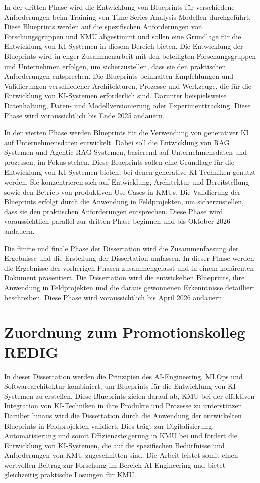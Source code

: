 \documentclass[11pt,a4paper,pointlessnumbers]{scrartcl}
\theoremstyle{break}
\numberwithin{equation}{section}
\begin{document}
In der dritten Phase wird die Entwicklung von Blueprints für verschiedene Anforderungen beim Training von Time Series Analysis Modellen durchgeführt. Diese Blueprints werden auf die spezifischen Anforderungen von Forschungsgruppen und KMU abgestimmt und sollen eine Grundlage für die Entwicklung von KI-Systemen in diesem Bereich bieten. Die Entwicklung der Blueprints wird in enger Zusammenarbeit mit den beteiligten Forschungsgruppen und Unternehmen erfolgen, um sicherzustellen, dass sie den praktischen Anforderungen entsprechen. Die Blueprints beinhalten Empfehlungen und Validierungen verschiedener Architekturen, Prozesse und Werkzeuge, die für die Entwicklung von KI-Systemen erforderlich sind. Darunter beispielsweise Datenhaltung, Daten- und Modellversionierung oder Experimenttracking. Diese Phase wird voraussichtlich bis Ende 2025 andauern.

In der vierten Phase werden Blueprints für die Verwendung von generativer KI auf Unternehmensdaten entwickelt. Dabei soll die Entwicklung von RAG Systemen und Agentic RAG Systemen, basierend auf Unternehmensdaten und -prozessen, im Fokus stehen. Diese Blueprints sollen eine Grundlage für die Entwicklung von KI-Systemen bieten, bei denen generative KI-Techniken genutzt werden. Sie konzentrieren sich auf Entwicklung, Architektur und Bereitstellung sowie den Betrieb von produktiven Use-Cases in KMUs. Die Validierung der Blueprints erfolgt durch die Anwendung in Feldprojekten, um sicherzustellen, dass sie den praktischen Anforderungen entsprechen. Diese Phase wird voraussichtlich parallel zur dritten Phase beginnen und bis Oktober 2026 andauern.

Die fünfte und finale Phase der Dissertation wird die Zusammenfassung der Ergebnisse und die Erstellung der Dissertation umfassen. In dieser Phase werden die Ergebnisse der vorherigen Phasen zusammengefasst und in einem kohärenten Dokument präsentiert. Die Dissertation wird die entwickelten Blueprints, ihre Anwendung in Feldprojekten und die daraus gewonnenen Erkenntnisse detailliert beschreiben. Diese Phase wird voraussichtlich bis April 2026 andauern.


\section{Zuordnung zum Promotionskolleg REDIG}
In dieser Dissertation werden die Prinzipien des AI-Engineering, MLOps und Softwarearchitektur kombiniert, um Blueprints für die Entwicklung von KI-Systemen zu erstellen. Diese Blueprints zielen darauf ab, KMU bei der effektiven Integration von KI-Techniken in ihre Produkte und Prozesse zu unterstützen. Darüber hinaus wird die Dissertation durch die Anwendung der entwickelten Blueprints in Feldprojekten validiert. Dies trägt zur Digitalisierung, Automatisierung und somit Effizienzsteigerung in KMU bei und fördert die Entwicklung von KI-Systemen, die auf die spezifischen Bedürfnisse und Anforderungen von KMU zugeschnitten sind. Die Arbeit leistet somit einen wertvollen Beitrag zur Forschung im Bereich AI-Engineering und bietet gleichzeitig praktische Lösungen für KMU.

\newpage

\end{document}
